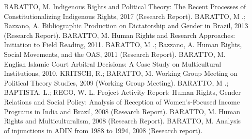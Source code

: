 
\begin{cvcitems}
  \cvcitem
      {BARATTO, M.}
      {Indigenous Rights and Political Theory: The Recent Processes of Constitutionalizing Indigenous Rights, 2017 (Research Report).}
  \cvcitem
      {BARATTO, M .; Bazzano, A.}
      {Bibliographic Production on Dictatorship and Gender in Brazil, 2013 (Research Report).}
  \cvcitem
      {BARATTO, M.}
      {Human Rights and Research Approaches: Initiation to Field Reading, 2011.}
  \cvcitem
      {BARATTO, M .; Bazzano, A.}
      {Human Rights, Social Movements, and the OAS, 2011 (Research Report).}
  \cvcitem
      {BARATTO, M.}
      {English Islamic Court Arbitral Decisions: A Case Study on Multicultural Institutions, 2010.}
  \cvcitem
      {KRITSCH, R.; BARATTO, M.}
      {Working Group Meeting on Political Theory Studies, 2009 (Working Group Meeting).}
  \cvcitem
      {BARATTO, M .; BAPTISTA, L.; REGO, W. L.}
      {Project Activity Report: Human Rights, Gender Relations and Social Policy: Analysis of Reception of Women's-Focused Income Programs in India and Brazil, 2008 (Research Report).}
  \cvcitem
      {BARATTO, M.}
      {Human Rights and Multiculturalism, 2008 (Research Report).}
  \cvcitem
      {BARATTO, M.}
      {Analysis of injunctions in ADIN from 1988 to 1994, 2008 (Research report).}
\end{cvcitems}

%
